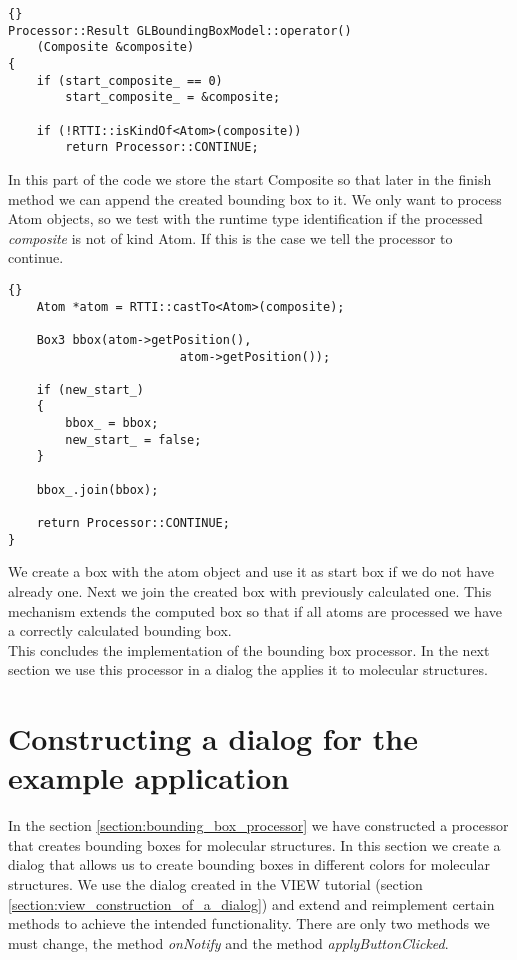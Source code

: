 \begin{lstlisting}{}
Processor::Result GLBoundingBoxModel::operator() 
	(Composite &composite)
{
	if (start_composite_ == 0)
		start_composite_ = &composite;

	if (!RTTI::isKindOf<Atom>(composite))
		return Processor::CONTINUE;
\end{lstlisting}

In this part of the code we store the start Composite so that later in the finish
method we can append the created bounding box to it.
We only want to process Atom objects, so we test with the runtime type
identification if the processed {\em composite} is not of kind Atom. If this
is the case we tell the processor to continue.

\begin{lstlisting}{}
	Atom *atom = RTTI::castTo<Atom>(composite);

	Box3 bbox(atom->getPosition(), 
						atom->getPosition());

	if (new_start_)
	{
		bbox_ = bbox;
		new_start_ = false;
	}

	bbox_.join(bbox);

	return Processor::CONTINUE;
}
\end{lstlisting}

We create a box with the atom object and use it as start box if we do not have already
one. Next we join the created box with previously calculated one. This mechanism
extends the computed box so that if all atoms are processed we have a correctly calculated
bounding box.\\

This concludes the implementation of the bounding box processor. In the next
section we use this processor in a dialog the applies it to molecular structures.



\section{Constructing a dialog for the example application}
\label{section:construction_of_a_dialog}

In the section \ref{section:bounding_box_processor} we have constructed a processor that creates bounding boxes
for molecular structures. In this section we create a dialog that allows us to
create bounding boxes in different colors for molecular structures. We use the dialog
created in the VIEW tutorial (section \ref{section:view_construction_of_a_dialog}) and extend and 
reimplement certain methods to achieve the intended functionality.
There are only two methods we must change, the method {\em onNotify} and the method
{\em applyButtonClicked}.

